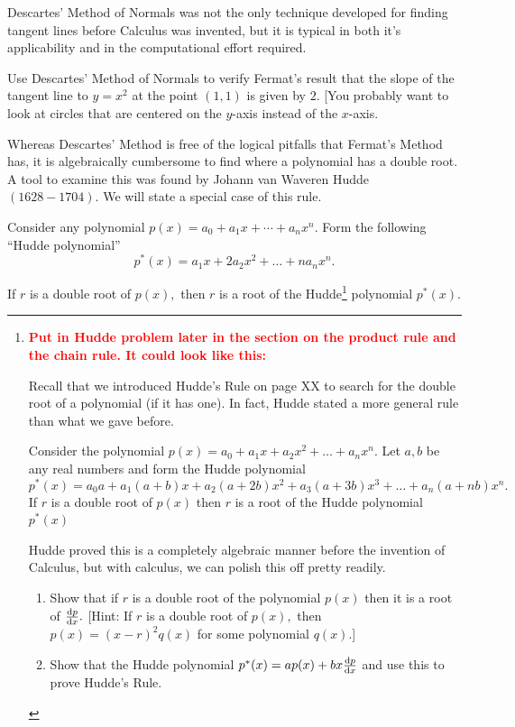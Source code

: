  Descartes' Method of Normals was not the only technique developed for
 finding tangent lines before Calculus was invented, but it is
 typical in both it's  applicability and in the computational effort
 required.

 \begin{embeddedproblem}{}
   Use Descartes' Method of Normals to verify Fermat's result that the
   slope of the tangent line to $y=x^2$ at the point $(1,1)$ is given by
   $2.$  [You probably want to look at circles that are centered on the
   $y$-axis instead of the $x$-axis.
 \end{embeddedproblem}

 Whereas Descartes' Method is free of the logical pitfalls that
 Fermat's Method has, it is algebraically cumbersome to find where a
 polynomial has a double root.  A tool to examine this was found by
 Johann van Waveren Hudde $(1628-1704).$  We will state a special case
 of this rule.

 Consider any polynomial $p(x)=a_0+a_1 x+⋯+a_n x^n.$ Form the following ``Hudde polynomial'' 
$$
p^* (x)=a_1 x+2a_2 x^2+\ldots+na_n x^n.
$$

If $r$ is a double root of $p(x),$ then $r$ is a root of the
Hudde\footnote{\textcolor{red}{\bf{}Put in Hudde problem later in the section on
    the product rule and the chain rule.  It could look like this:}

	Recall that we introduced Hudde's Rule on page XX to search for the double root of a polynomial (if it has one).  In fact, Hudde stated a more general rule than what we gave before.

  Consider the polynomial $p(x)=a_0+a_1x+a_2x^2+\ldots{}+a_n x^n.$ Let $a,b$ be any real numbers and form the Hudde polynomial 
$$
p^*(x)=a_0 a+a_1 (a+b)x+a_2 (a+2b) x^2+a_3 (a+3b) x^3+\ldots+a_n
(a+nb) x^n.
$$
If $r$ is a double root of $p(x)$ then $r$ is a root of the Hudde
polynomial $p^*(x)$ 

	Hudde proved this is a completely algebraic manner before the invention of Calculus, but with calculus, we can polish this off pretty readily.

        \begin{embeddedproblem}{}
          \begin{enumerate}
          \item Show that if $r$ is a double root of the polynomial
            $p(x)$ 
            then it is a root of $\frac{\text{d}{p}}{\text{d}{x}}.$  [Hint: If $r$ is a double root
            of $p(x),$ then $p(x)=(x-r)^2 q(x)$ for some polynomial
            $q(x).$]
          \item Show that the Hudde polynomial
            $p^*(x)=ap(x)+bx\frac{\text{d}{p}}{\text{d}{x}}$ 
            and use this to prove Hudde's Rule.
          \end{enumerate}
      \end{embeddedproblem}
} polynomial $p^*(x).$

